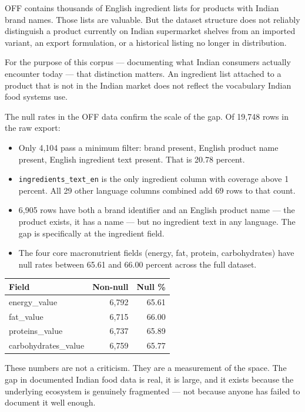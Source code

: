 \documentclass[
  letterpaper,
  DIV=11,
  numbers=noendperiod]{scrartcl}
\newcounter{none} %
\providecommand{\tightlist}{%
  \setlength{\itemsep}{0pt}\setlength{\parskip}{0pt}}
\begin{document}
OFF contains thousands of English ingredient lists for products with
Indian brand names. Those lists are valuable. But the dataset structure
does not reliably distinguish a product currently on Indian supermarket
shelves from an imported variant, an export formulation, or a historical
listing no longer in distribution.

For the purpose of this corpus --- documenting what Indian consumers
actually encounter today --- that distinction matters. An ingredient
list attached to a product that is not in the Indian market does not
reflect the vocabulary Indian food systems use.

The null rates in the OFF data confirm the scale of the gap. Of 19,748
rows in the raw export:

\begin{itemize}
\tightlist
\item
  Only 4,104 pass a minimum filter: brand present, English product name
  present, English ingredient text present. That is 20.78 percent.
\item
  \texttt{ingredients\_text\_en} is the only ingredient column with
  coverage above 1 percent. All 29 other language columns combined add
  69 rows to that count.
\item
  6,905 rows have both a brand identifier and an English product name
  --- the product exists, it has a name --- but no ingredient text in
  any language. The gap is specifically at the ingredient field.
\item
  The four core macronutrient fields (energy, fat, protein,
  carbohydrates) have null rates between 65.61 and 66.00 percent across
  the full dataset.
\end{itemize}

{\def\LTcaptype{none} %
\begin{longtable}[]{@{}lrr@{}}
\toprule\noalign{}
Field & Non-null & Null \% \\
\midrule\noalign{}
\endhead
\bottomrule\noalign{}
\endlastfoot
energy\_value & 6,792 & 65.61 \\
fat\_value & 6,715 & 66.00 \\
proteins\_value & 6,737 & 65.89 \\
carbohydrates\_value & 6,759 & 65.77 \\
\end{longtable}
}

These numbers are not a criticism. They are a measurement of the space.
The gap in documented Indian food data is real, it is large, and it
exists because the underlying ecosystem is genuinely fragmented --- not
because anyone has failed to document it well enough.
\end{document}
